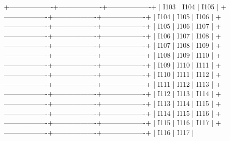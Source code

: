 +-------------------+-------------------+-------------------+
|       I103         |       I104         |       I105        |
+-------------------+-------------------+-------------------+
|       I104         |       I105         |       I106        |
+-------------------+-------------------+-------------------+
|       I105         |       I106         |       I107        |
+-------------------+-------------------+-------------------+
|       I106         |       I107         |       I108        |
+-------------------+-------------------+-------------------+
|       I107         |       I108         |       I109        |
+-------------------+-------------------+-------------------+
|       I108         |       I109         |       I110        |
+-------------------+-------------------+-------------------+
|       I109         |       I110         |       I111        |
+-------------------+-------------------+-------------------+
|       I110         |       I111         |       I112        |
+-------------------+-------------------+-------------------+
|       I111         |       I112         |       I113        |
+-------------------+-------------------+-------------------+
|       I112         |       I113         |       I114        |
+-------------------+-------------------+-------------------+
|       I113         |       I114         |       I115        |
+-------------------+-------------------+-------------------+
|       I114         |       I115         |       I116        |
+-------------------+-------------------+-------------------+
|       I115         |       I116         |       I117        |
+-------------------+-------------------+-------------------+
|       I116         |       I117         |